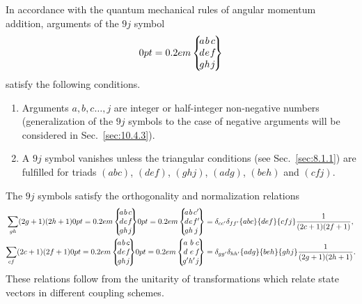 In accordance with the quantum mechanical rules of angular momentum addition, arguments of the $9 j$ symbol
\[
\ninej{a}{b}{c}{d}{e}{f}{g}{h}{j}
\]
satisfy the following conditions.
\begin{enumerate}
    \item  Arguments $a, b, c \ldots, j$ are integer or half-integer non-negative numbers (generalization of the $9 j$ symbols to the case of negative arguments will be considered in Sec.~\ref{sec:10.4.3}).\\
\item A $9 j$ symbol vanishes unless the triangular conditions (see Sec.~\ref{sec:8.1.1}) are fulfilled for triads $(abc)$, $(def)$, $(g h j)$, $(a d g)$, $(b e h)$ and $(c f j)$.
\end{enumerate}
The $9 j$ symbols satisfy the orthogonality and normalization relations
\begin{align}
 \sum_{g h}(2 g+1)(2 h+1)\ninej{a}{b}{c}{d}{e}{f}{g}{h}{j}\ninej{a}{b}{c^{\prime}}{d}{e}{f^{\prime}}{g}{h}{j}&=\delta_{c c^{\prime}} \delta_{f f^{\prime}}\{a b c\}\{d e f\}\{c f j\} \frac{1}{(2 c+1)(2 f+1)},  \label{eq:10:1:9}\\
 \sum_{c f}(2 c+1)(2 f+1)\ninej{a}{b}{c}{d}{e}{f}{g}{h}{j}\ninej{a}{b}{c}{d}{e}{f}{g^{\prime}}{h^{\prime}}{j}&=\delta_{g g^{\prime}} \delta_{h h^{\prime}}\{a d g\}\{b e h\}\{g h j\} \frac{1}{(2 g+1)(2 h+1)} . \label{eq:10:1:10}
\end{align}
These relations follow from the unitarity of transformations which relate state vectors in different coupling schemes.

